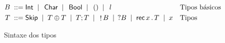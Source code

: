 
\begin{figure}[t]
  \begin{align*}
    B \; ::= \; & \mathsf{Int} \;\mid\; \, \mathsf{Char} \;\mid\; \, \mathsf{Bool} \;\mid\; \, ()  \;\mid\; \, l && \text{Tipos básicos}\\
    T \; ::= \;       & \mathsf{Skip} \;\mid\; T \oplus T \;\mid\; T;T  \;\mid\; \,\mathop!B \;\mid\; \,?B \;\mid\; \mathsf{rec}\,x\,.\,T \;\mid\; x && \text{Tipos} 
  \end{align*}
  \hrulefill
  \caption{Sintaxe dos tipos}
  \label{fig:types}
\end{figure}


